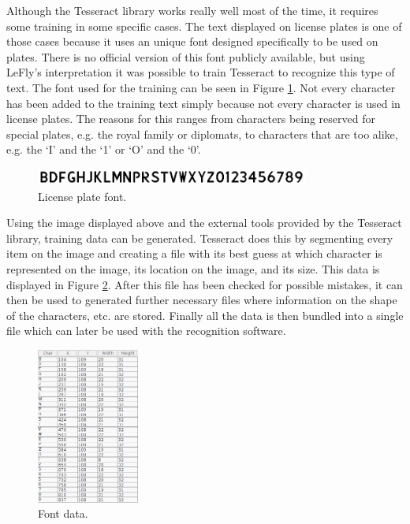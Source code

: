 
Although the Tesseract library works really well most of the time, it requires some training in some specific cases. The text displayed on license plates is one of those cases because it uses an unique font designed specifically to be used on plates. There is no official version of this font publicly available, but using LeFly's \cite{lefly} interpretation it was possible to train Tesseract to recognize this type of text. The font used for the training can be seen in Figure \ref{fig:plate-font}. Not every character has been added to the training text simply because not every character is used in license plates. The reasons for this ranges from characters being reserved for special plates, e.g. the royal family or diplomats, to characters that are too alike, e.g. the `I' and the `1' or `O' and the `0'.

\begin{figure}[ht]
    \centering
    \includegraphics[width=0.8\textwidth]{plaatjes/font}
    \caption{License plate font.}
    \label{fig:plate-font}
\end{figure}%

Using the image displayed above and the external tools provided by the Tesseract library, training data can be generated. Tesseract does this by segmenting every item on the image and creating a file with its best guess at which character is represented on the image, its location on the image, and its size. This data is displayed in Figure \ref{fig:text-data}. After this file has been checked for possible mistakes, it can then be used to generated further necessary files where information on the shape of the characters, etc. are stored. Finally all the data is then bundled into a single file which can later be used with the recognition software.

\begin{figure}[ht]
    \centering
    \includegraphics[width=0.3\textwidth]{plaatjes/text-data}
    \caption{Font data.}
    \label{fig:text-data}
\end{figure}%

